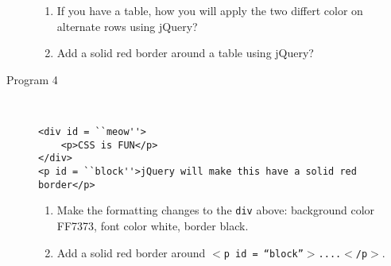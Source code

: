 \documentclass[11pt,a4paper]{article}
\def\AnswerBox{\fbox{\begin{minipage}{4in}\hfill\vspace{0.5in}\end{minipage}}}
\begin{document}
\begin{description}
\begin{lstlisting}
\end{lstlisting}
\AnswerBox

\begin{enumerate}[label=\bfseries Q\arabic*:]\itemsep10pt
\item If you have a table, how you will apply the two differt color on alternate rows using jQuery?
\item Add a solid red border around a table using jQuery?
\end{enumerate}

\item [Program 4]\ 
\begin{lstlisting}
<div id = ``meow''>
    <p>CSS is FUN</p>
</div>
<p id = ``block''>jQuery will make this have a solid red border</p>
\end{lstlisting}
\AnswerBox

\begin{enumerate}[label=\bfseries Q\arabic*:]\itemsep10pt
\item Make the formatting changes to the \texttt{div} above: background color FF7373, font color white, border black.
\item Add a solid red border around \texttt{$<$p id = ``block''$>$....$<$/p$>$}.
\end{enumerate}

\end{description}
\end{document}
